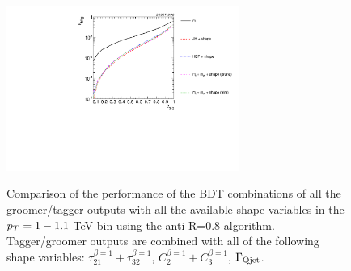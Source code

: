 \begin{figure}
\centering
{\includegraphics[width=0.68\textwidth]{./Figures/TTagging/multi_variable/pT.1TeV.R.0.8/Rocs_optimum.pdf}}
\caption{Comparison of the performance of the BDT combinations of all the groomer/tagger outputs with all the available shape variables in the $p_T = 1-1.1$ TeV bin using the anti-\kT R=0.8 algorithm. Tagger/groomer outputs are combined with all of the following shape variables: $\tau_{21}^{\beta=1}+\tau_{32}^{\beta=1}$, $C_{2}^{\beta=1}+C_{3}^{\beta=1}$, $\Gamma_{\rm Qjet}$.}
\label{fig:pt1000_allcompare_AKt_R08_Final}
\end{figure}


